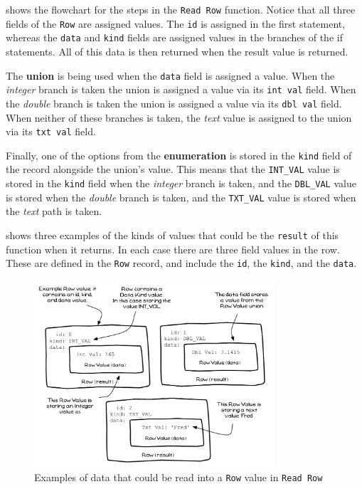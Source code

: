  shows the flowchart for the steps in the \texttt{Read Row} function. Notice that all three fields of the \texttt{Row} are assigned values. The \texttt{id} is assigned in the first statement, whereas the \texttt{data} and \texttt{kind} fields are assigned values in the branches of the if statements. All of this data is then returned when the result value is returned.

The \textbf{union} is being used when the \texttt{data} field is assigned a value. When the \emph{integer} branch is taken the union is assigned a value via its \texttt{int val} field. When the \emph{double} branch is taken the union is assigned a value via its \texttt{dbl val} field. When neither of these branches is taken, the \emph{text} value is assigned to the union via its \texttt{txt val} field.

Finally, one of the options from the \textbf{enumeration} is stored in the \texttt{kind} field of the record alongside the union's value. This means that the \texttt{INT\_VAL} value is stored in the \texttt{kind} field when the \emph{integer} branch is taken, and the \texttt{DBL\_VAL} value is stored when the \emph{double} branch is taken, and the \texttt{TXT\_VAL} value is stored when the \emph{text} path is taken.

 shows three examples of the kinds of values that could be the \texttt{result} of this function when it returns. In each case there are three field values in the row. These are defined in the \texttt{Row} record, and include the \texttt{id}, the \texttt{kind}, and the \texttt{data}.

\begin{figure}[htbp]
   \centering
   \includegraphics[width=0.8\textwidth]{./topics/type-decl/diagrams/RowDataRead} 
   \caption{Examples of data that could be read into a \texttt{Row} value in \texttt{Read Row}}
   \label{fig:read-row-data}
\end{figure}

